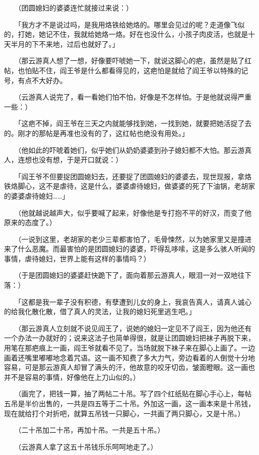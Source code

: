 \documentclass[UTF8]{ctexart}
\begin{document}
　　（团圆媳妇的婆婆连忙就接过来说：）

　　「我方才不是说过吗，是我用烙铁给她烙的。哪里会见过的呢？走道像飞似的，打她，她记不住，我就给她烙一烙。好在也没什么，小孩子肉皮活，也就是十天半月的下不来地，过后也就好了。」

　　（那云游真人想了一想，好像要吓唬她一下，就说这脚心的疤，虽然是贴了红帖，也怕贴不住，阎王爷是什么都看得见的，这疤怕是就给了阎王爷以特殊的记号，有点不大好办。

　　（云游真人说完了，看一看她们怕不怕，好像是不怎样怕。于是他就说得严重一些：）

　　「这疤不掉，阎王爷在三天之内就能够找到她，一找到她，就要把她活捉了去的。刚才的那帖是再准也没有的了，这红帖也绝没有用处。」

　　（他如此的吓唬着她们，似乎她们从奶奶婆婆到孙子媳妇都不大怕。那云游真人，连想也没有想，于是开口就说：）

　　「阎王爷不但要捉团圆媳妇去，还要捉了团圆媳妇的婆婆去，现世现报，拿烙铁烙脚心，这不是虐待，这是什么，婆婆虐待媳妇，做婆婆的死了下油锅，老胡家的婆婆虐待媳妇……」

　　（他就越说越声大，似乎要喊了起来，好像他是专打抱不平的好汉，而变了他原来的态度了。）

　　（一说到这里，老胡家的老少三辈都害怕了，毛骨悚然，以为她家里又是撞进来了什么恶魔。而最害怕的是团圆媳妇的婆婆，吓得乱哆嗦，这是多么骇人听闻的事情，虐待媳妇，世界上能有这样的事情吗？）

　　（于是团圆媳妇的婆婆赶快跪下了，面向着那云游真人，眼泪一对一双地往下落：）

　　「这都是我一辈子没有积德，有孽遭到儿女的身上，我哀告真人，请真人诚心的给我化散化散，借了真人的灵法，让我的媳妇死里逃生吧。」

　　（那云游真人立刻就不说见阎王了，说她的媳妇一定见不了阎王，因为他还有一个办法一办就好的；说来这法子也简单得很，就是让团圆媳妇把袜子再脱下来，用笔在那疤痕上一画，阎王爷就看不见了。当场就脱下袜子来在脚心上画了。一边画着还嘴里嘟嘟地念着咒语。这一画不知费了多大力气，旁边看着的人倒觉十分地容易，可是那云游真人却冒了满头的汗，他故意的咬牙切齿，皱面瞪眼。这一画也并不是容易的事情，好像他在上刀山似的。）

　　（画完了，把钱一算，抽了两帖二十吊。写了四个红纸贴在脚心手心上，每帖五吊是半价出售的，一共是四五等于二十吊。外加这一画，这一画本来是十吊钱，现在就给打个对折吧，就算五吊钱一只脚心，一共画了两只脚心，又是十吊。）

　　（二十吊加二十吊，再加十吊。一共是五十吊。）

　　（云游真人拿了这五十吊钱乐乐呵呵地走了。）
\end{document}
